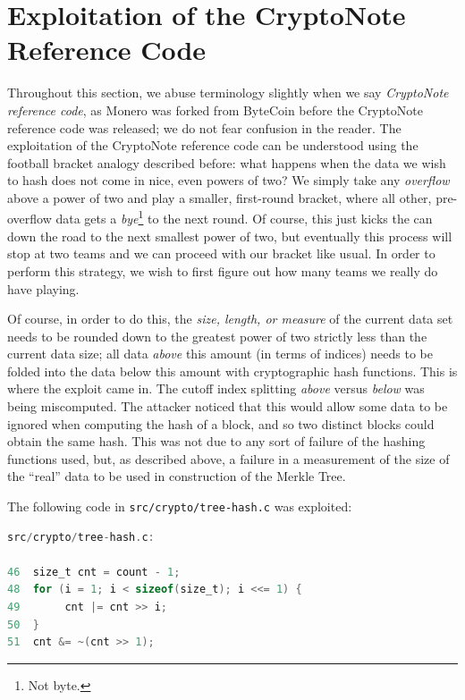 \documentclass{mrl}
\begin{document}
\section{Exploitation of the CryptoNote Reference Code}
Throughout this section, we abuse terminology slightly when we say \emph{CryptoNote reference code}, as Monero was forked from ByteCoin before the CryptoNote reference code was released; we do not fear confusion in the reader. The exploitation of the CryptoNote reference code can be understood using the football bracket analogy described before: what happens when the data we wish to hash does not come in nice, even powers of two? We simply take any \emph{overflow} above a power of two and play a smaller, first-round bracket, where all other, pre-overflow data gets a \emph{bye}\footnote{Not byte.} to the next round. Of course, this just kicks the can down the road to the next smallest power of two, but eventually this process will stop at two teams and we can proceed with our bracket like usual. In order to perform this strategy, we wish to first figure out how many teams we really do have playing.

Of course, in order to do this, the \emph{size, length, or measure} of the current data set needs to be rounded down to the greatest power of two strictly less than the current data size; all data \emph{above} this amount (in terms of indices) needs to be folded into the data below this amount with cryptographic hash functions. This is where the exploit came in. The cutoff index splitting \emph{above} versus \emph{below} was being miscomputed. The attacker noticed that this would allow some data to be ignored when computing the hash of a block, and so two distinct blocks could obtain the same hash. This was not due to any sort of failure of the hashing functions used, but, as described above, a failure in a measurement of the size of the ``real'' data to be used in construction of the Merkle Tree.

The following code in \texttt{src/crypto/tree-hash.c} was exploited:

\begin{lstlisting}[language=C]
src/crypto/tree-hash.c:

46  size_t cnt = count - 1;
48  for (i = 1; i < sizeof(size_t); i <<= 1) {
49       cnt |= cnt >> i;
50  }
51  cnt &= ~(cnt >> 1);

\end{lstlisting}
\end{document}
